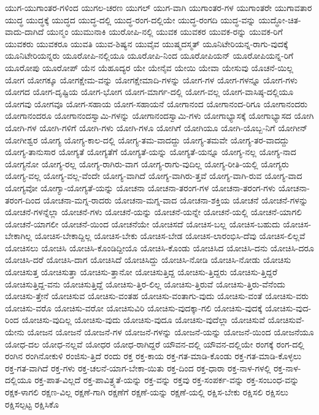 {ಯುಗ-ಯುಗಾಂತರ-ಗಳಿಂದ
ಯುಗಲ-ಚರಣ
ಯುಗಲ್
ಯುಗ-ವಾಗಿ
ಯುಗಾಂತರ-ಗಳ
ಯುಗಾಂತರೇ
ಯುಗಾವತಾರ
ಯುದ್ಧ
ಯುದ್ಧಕ್ಕೆ
ಯುದ್ಧದ
ಯುದ್ಧ-ದಲ್ಲಿ
ಯುದ್ಧ-ರಂಗ-ದಲ್ಲಿಯೇ
ಯುದ್ಧ-ರಂಗದಿ
ಯುದ್ಧ-ವನ್ನು
ಯುದ್ಧೋ-ಚಿತ-ವಾದು-ದಾಗಿದೆ
ಯುನ್ಮಂ
ಯುಮುನಾಕಿ
ಯುರೋಪಿ-ನಲ್ಲಿ
ಯುವಕ
ಯುವಕರ
ಯುವಕ-ರನ್ನು
ಯುವಕ-ರಿಗೆ
ಯುವಕರು
ಯುವಕರೂ
ಯುವತಿ
ಯುವ-ಶಿಷ್ಯನ
ಯುವೈವ
ಯುಷ್ಮದಸ್ಮತ್
ಯೂನಿಟೇರಿಯನ್ನ-ರಾಗು-ವುದಕ್ಕೆ
ಯೂನಿಟೇರಿಯನ್ನರು
ಯೂರೋಪಿ-ನಲ್ಲಿಯೂ
ಯೂರೋಪಿ-ನಿಂದ
ಯೂರೋಪಿಯನ್
ಯೂರೋಪಿಯನ್ನ-ರಿಗೆ
ಯೂರೋಪು
ಯೂರೋಪ್
ಯೆನ
ಯೆಹೂದ್ಯರ
ಯೇ
ಯೇನೈವ
ಯೇಯಿ
ಯೇವಾ
ಯೇಸುವು
ಯೊಚನೆ-ಯಿಲ್ಲ
ಯೋಗ
ಯೋಗಕ್ಕೂ
ಯೋಗಕ್ಷೇಮ-ವನ್ನು
ಯೋಗಕ್ಷೇಮಾದಿ-ಗಳನ್ನು
ಯೋಗ-ಗಳ
ಯೋಗ-ಗಳನ್ನೂ
ಯೋಗ-ಗಳು
ಯೋಗದ
ಯೋಗ-ದೃಷ್ಟಿಯ
ಯೋಗ-ಭೋಗ
ಯೋಗ-ಮಾರ್ಗ-ದಲ್ಲಿ
ಯೋಗ-ವಲ್ಲ
ಯೋಗ-ವಾಸಿಷ್ಠ-ದಲ್ಲಿಯೂ
ಯೋಗವು
ಯೋಗವೂ
ಯೋಗ-ಸಹಾಯ
ಯೋಗ-ಸಹಾಯನೆ
ಯೋಗಾನಂದ
ಯೋಗಾನಂದ-ರಿಗೂ
ಯೋಗಾನಂದರು
ಯೋಗಾನಂದರೂ
ಯೋಗಾನಂದಸ್ವಾಮಿ-ಗಳನ್ನು
ಯೋಗಾನಂದಸ್ವಾಮಿ-ಗಳು
ಯೋಗಾಭ್ಯಾಸಕ್ಕೆ
ಯೋಗಾಭ್ಯಾಸದ
ಯೋಗಿ
ಯೋಗಿ-ಗಳ
ಯೋಗಿ-ಗಳಿಗೆ
ಯೋಗಿ-ಗಳು
ಯೋಗಿ-ಗಳೂ
ಯೋಗಿಗೆ
ಯೋಗಿಯೂ
ಯೋಗಿ-ಯೊಬ್ಬ-ನಿಗೆ
ಯೋಗೀನ್
ಯೋಗೀಶ್ವರ
ಯೋಗ್ಯ
ಯೋಗ್ಯ-ಕಾಲ-ದಲ್ಲಿ
ಯೋಗ್ಯ-ತಮ-ವಾದದ್ದು
ಯೋಗ್ಯ-ತಮವೇ
ಯೋಗ್ಯ-ತರ-ವಾದದ್ದು
ಯೋಗ್ಯ-ತಾನುಸಾರ
ಯೋಗ್ಯತೆ
ಯೋಗ್ಯತೆಗೆ
ಯೋಗ್ಯತೆ-ಯನ್ನು
ಯೋಗ್ಯತೆ-ಯನ್ನೂ
ಯೋಗ್ಯ-ನಲ್ಲ
ಯೋಗ್ಯ-ನಾದ
ಯೋಗ್ಯನೋ
ಯೋಗ್ಯ-ರಲ್ಲ
ಯೋಗ್ಯ-ರಾಗಿರು-ವಾಗ
ಯೋಗ್ಯ-ರಾಗು-ವುದಿಲ್ಲ
ಯೋಗ್ಯ-ರೀತಿ-ಯಲ್ಲಿ
ಯೋಗ್ಯರು
ಯೋಗ್ಯ-ವಲ್ಲ
ಯೋಗ್ಯ-ವಲ್ಲ-ವೆಂದೇ
ಯೋಗ್ಯ-ವಾಗಿದೆ
ಯೋಗ್ಯ-ವಾಗಿರು-ತ್ತವೆ
ಯೋಗ್ಯ-ವಾಗಿ-ರುವ
ಯೋಗ್ಯ-ವಾದ
ಯೋಗ್ಯವೋ
ಯೋಗ್ಯಾ-ಯೋಗ್ಯತೆ-ಯನ್ನು
ಯೋಚನಾ
ಯೋಚನಾ-ತರಂಗ-ಗಳ
ಯೋಚನಾ-ತರಂಗ-ಗಳು
ಯೋಚನಾ-ತರಂಗ-ದಿಂದ
ಯೋಚನಾ-ಮಗ್ನ-ರಾದರು
ಯೋಚನಾ-ಮಗ್ನ-ವಾದ
ಯೋಚನಾ-ಶಕ್ತಿಯ
ಯೋಚನೆ
ಯೋಚನೆ-ಗಳನ್ನು
ಯೋಚನೆ-ಗಳನ್ನೆಲ್ಲಾ
ಯೋಚನೆ-ಗಳು
ಯೋಚನೆ-ಯನ್ನು
ಯೋಚನೆ-ಯನ್ನೇ
ಯೋಚನೆ-ಯಲ್ಲಿ
ಯೋಚನೆ-ಯಾಗಲಿ
ಯೋಚನೆ-ಯಾಗಲೀ
ಯೋಚನೆ-ಯಿಂದ
ಯೋಚನೆಯೇ
ಯೋಚಿಸದೆ
ಯೋಚಿಸ-ಬಲ್ಲ
ಯೋಚಿಸ-ಬಹುದು
ಯೋಚಿಸ-ಬೇಕಾಗಿಲ್ಲ
ಯೋಚಿಸ-ಬೇಕಾದ್ದಿಲ್ಲ
ಯೋಚಿಸ-ಬೇಕು
ಯೋಚಿಸ-ಬೇಡ
ಯೋಚಿಸ-ಲಾರಂಭಿಸಿ-ದೆವು
ಯೋಚಿಸ-ಲಿಲ್ಲವೆ
ಯೋಚಿಸಲು
ಯೋಚಿಸಿ
ಯೋಚಿಸಿ-ಕೊಂಡಿದ್ದೀಯೊ
ಯೋಚಿಸಿ-ಕೊಂಡು
ಯೋಚಿಸಿದ
ಯೋಚಿಸಿ-ದನು
ಯೋಚಿಸಿ-ದರೂ
ಯೋಚಿಸಿ-ದರೆ
ಯೋಚಿಸಿ-ದಾಗ
ಯೋಚಿಸಿದೆ
ಯೋಚಿಸಿದ್ದು
ಯೋಚಿಸಿ-ನೋಡಿ
ಯೋಚಿಸಿ-ನೋಡು
ಯೋಚಿಸು
ಯೋಚಿಸುತ್ತ
ಯೋಚಿಸುತ್ತಾ
ಯೋಚಿಸು-ತ್ತಾನೋ
ಯೋಚಿಸುತ್ತಿದ್ದ
ಯೋಚಿಸು-ತ್ತಿದ್ದರು
ಯೋಚಿಸು-ತ್ತಿದ್ದರೆ
ಯೋಚಿಸುತ್ತಿದ್ದ-ವನು
ಯೋಚಿಸುತ್ತಿದ್ದೆ
ಯೋಚಿಸು-ತ್ತಿರ-ಲಿಲ್ಲ
ಯೋಚಿಸು-ತ್ತಿರುವೆ
ಯೋಚಿಸು-ತ್ತಿರು-ವೆನೆಂದು
ಯೋಚಿಸು-ತ್ತೇನೆ
ಯೋಚಿಸುವ
ಯೋಚಿಸು-ವಂತಹ
ಯೋಚಿಸು-ವಂತಾಗು-ವುದು
ಯೋಚಿಸು-ವಂತೆ
ಯೋಚಿಸು-ವರು
ಯೋಚಿಸು-ವರೊ
ಯೋಚಿಸು-ವರೋ
ಯೋಚಿಸುವಿರಿ
ಯೋಚಿಸು-ವುದಕ್ಕಾ-ಗಲಿ
ಯೋಚಿಸು-ವುದಕ್ಕೆ
ಯೋಚಿಸು-ವುದ-ರಿಂದ
ಯೋಚಿಸು-ವುದಿಲ್ಲ
ಯೋಚಿಸು-ವುದು
ಯೋಚಿಸು-ವುದೂ
ಯೋಚಿಸು-ವುದೆಲ್ಲಾ
ಯೋಚಿಸುವೆ
ಯೋಚಿಸುವೆ-ಯೇನು
ಯೋಜನ
ಯೋಜನೆ
ಯೋಜನೆ-ಗಳ
ಯೋಜನೆ-ಗಳನ್ನು
ಯೋಜನೆ-ಯನ್ನು
ಯೋಜನೆ-ಯಿಂದ
ಯೋಜನೆಯೂ
ಯೋಧ-ದಲ
ಯೋಧ-ನಲ್ಲವೆ
ಯೋಧರ
ಯೋಧ-ರಾಗಿದ್ದರೆ
ಯೌವನ-ದಲ್ಲಿ
ಯೌವನ-ದಲ್ಲಿಯೇ
ರಂಗಕ್ಕೆ
ರಂಗ-ದಲ್ಲಿ
ರಂಗಿನ
ರಂಗಿನೋಕುಳಿ
ರಂಜಿಸು-ತ್ತಿದೆ
ರಂದು
ರಕ್ತ
ರಕ್ತ-ಕಾಯ
ರಕ್ತ-ಗತ-ಮಾಡಿ-ಕೊಂಡು
ರಕ್ತ-ಗತ-ಮಾಡಿ-ಕೊಳ್ಳಲು
ರಕ್ತ-ಗತ-ವಾಗಿದೆ
ರಕ್ತ-ಗಳು
ರಕ್ತ-ಚಲನೆ-ಯಾಗ-ಬೇಕಾ-ಯಿತು
ರಕ್ತ-ದಿಂದ
ರಕ್ತ-ಧಾರಾ
ರಕ್ತ-ನಾಳ-ಗಳಲ್ಲಿ
ರಕ್ತ-ನಾಳ-ದಲ್ಲಿಯೂ
ರಕ್ತ-ಪಾತ-ವಿಲ್ಲದೆ
ರಕ್ತ-ಪಾವಿತ್ರ್ಯತೆ-ಯನ್ನು
ರಕ್ತ-ವನ್ನು
ರಕ್ತವು
ರಕ್ತ-ಸಂಪರ್ಕ-ವನ್ನು
ರಕ್ತ-ಸಂಬಂಧ-ವನ್ನು
ರಕ್ಷಕ-ಳಾಗಲಿ
ರಕ್ಷಣ-ವಿಲ್ಲ
ರಕ್ಷಣೆ-ಗಾಗಿ
ರಕ್ಷಣೆಗೆ
ರಕ್ಷಣೆ-ಯನ್ನು
ರಕ್ಷಣೆ-ಯಲ್ಲಿ
ರಕ್ಷಿಸ-ಬೇಕು
ರಕ್ಷಿಸಲಿ
ರಕ್ಷಿಸಲು
ರಕ್ಷಿಸಲ್ಪಟ್ಟ
ರಕ್ಷಿಸಿಕೊ
}
